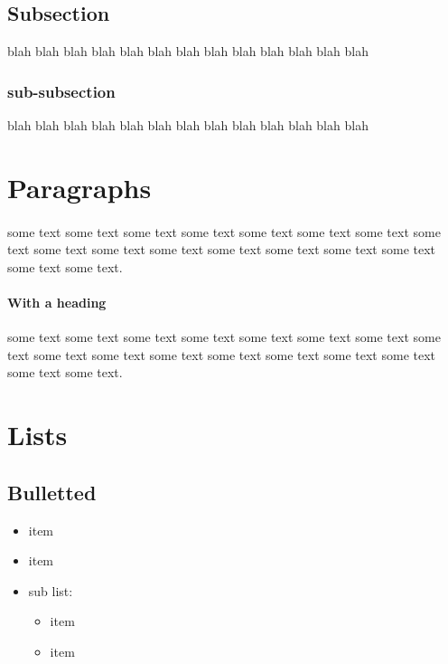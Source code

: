 \documentclass[12pt]{article}
\begin{document}
  \subsection{Subsection}
  blah blah blah blah blah blah blah blah blah blah blah blah blah

  \subsubsection{sub-subsection}
  blah blah blah blah blah blah blah blah blah blah blah blah blah

  \section{Paragraphs}

  \paragraph{} some text some text some text some text some text some text some text some text some text some text some text some text some text some text some text some text some text.

  \paragraph{With a heading} some text some text some text some text some text some text some text some text some text some text some text some text some text some text some text some text some text.

  \section{Lists}

  \subsection{Bulletted}

    \begin{itemize}
      \item item
      \item item
      \item sub list:
      \begin{itemize}
        \item item
        \item item
      \end{itemize}
    \end{itemize}
\end{document}
